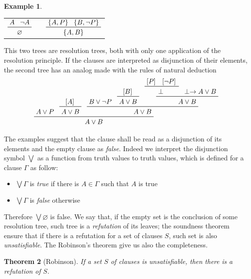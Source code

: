 \documentclass[a4paper,12pt,oneside]{book}
\newtheorem{theorem}{Theorem}[chapter]
\newtheorem{example}[theorem]{Example}
\let\emptyset\varnothing
\let\o\vee
\let\e\wedge
\let\bottom\perp
\begin{document}
\newpage\noindent\begin{example}
\end{example}
\begin{center}
\begin{tabular}{ccc}
$\prftree{A}{\neg A}{\emptyset}$& \hspace{4cm}&
$\prftree{\{A,P \}}{\{B, \neg P \}}{\{A,B \}}$
\end{tabular}
\end{center}
This two trees are resolution trees, both with only one application of the resolution principle. If the clauses are interpreted as disjunction of their elements, the second tree has an analog made with the rules of natural deduction 
\begin{equation*}
\prftree{\prfassumption{A\o P}}
{\prftree{\prfboundedassumption{A} }{A\o B}}
{\prftree{\prfassumption{B\o\neg P} }{\prftree{\prfboundedassumption{B} }{A\o B}}
 { \prftree{ \prftree{\prfboundedassumption{P}}{\prfboundedassumption{\neg P}}{\bottom}}{\prfassumption{ \bottom\rightarrow A\o B }}{A\o B} } 
{ A\o B} }
{A\o B}
\end{equation*}


The examples suggest that the clause shall be read as a disjunction of its elements and the empty clause as \textit{false}. Indeed we interpret the disjunction symbol $\bigvee$ as a function from truth values to truth values, which is defined for a clause $\Gamma$ as follow:
\begin{itemize}
\item $\bigvee \Gamma$ is  \textit{true} if there is $A\in\Gamma$ such that $A$ is true
\item  $\bigvee \Gamma$ is \textit{false} otherwise
\end{itemize}
Therefore $\bigvee\emptyset$ is false. We say that, if the empty set is the conclusion of some resolution tree, such tree is a \textit{refutation} of its leaves; the soundness theorem ensure that if there is a refutation for a set of clauses $S$, such set is also \textit{unsatisfiable}. The Robinson's theorem \cite{robinson} give us also the completeness.
\begin{theorem}[Robinson]\label{originalRob}
If a set $S$ of clauses is unsatisfiable, then there is a refutation of $S$.
\end{theorem}
\end{document}
